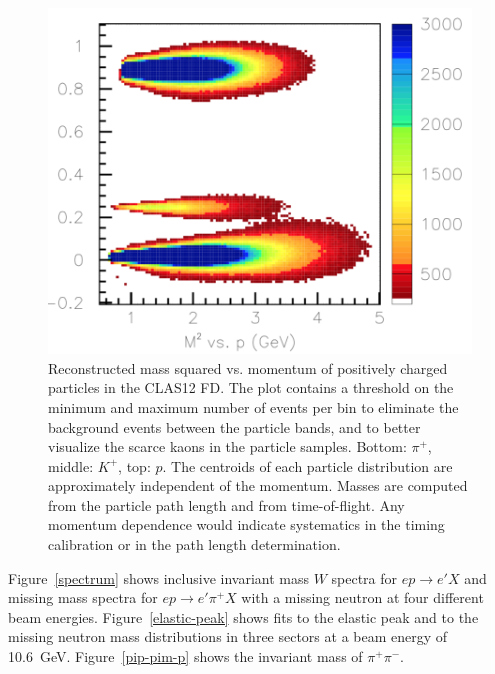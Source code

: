 \documentclass[final,3p,twocolumn]{elsarticle}
\begin{document}
\begin{figure}[tbp!]
\centerline{\includegraphics[width=1.0\columnwidth]{FTOF1b_M2-vs-p.png}}
\caption{Reconstructed mass squared vs. momentum of positively charged particles in the CLAS12 FD. The plot
  contains a threshold on the minimum and maximum number of events per bin to eliminate the background events 
  between the particle bands, and to better visualize the scarce kaons in the particle samples. Bottom: $\pi^+$, middle: $K^+$, top: $p$. 
  The centroids of each particle distribution are approximately independent of the
  momentum. Masses are computed from the particle path length and from time-of-flight. Any momentum
  dependence would indicate systematics in the timing calibration or in the path length determination.}
\label{mass2-mom}
\end{figure} 


Figure~\ref{spectrum} shows inclusive invariant mass $W$ spectra for $ep \to e' X$ and missing mass spectra
for $ep \to e' \pi^+ X$ with a missing neutron at four different beam energies. Figure~\ref{elastic-peak} shows
fits to the elastic peak and to the missing neutron mass distributions in three sectors at a beam energy of 10.6~GeV.
Figure~\ref{pip-pim-p} shows the invariant mass of $\pi^+\pi^-$.
\end{document}
